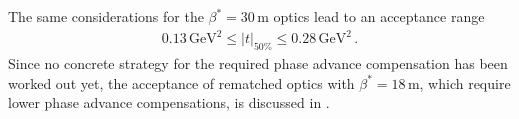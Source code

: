The same considerations for the $\beta^*=30\,$m optics lead to an acceptance range
%
\begin{align}
0.13 \, \text{GeV}^2 \leq |t|_{\text{50}\%} \leq 0.28 \, \text{GeV}^2 \, .
\end{align}
%
Since no concrete strategy for the required phase advance compensation has been worked out yet, the acceptance of rematched optics with $\beta^*=18\,$m, which require lower phase advance compensations, is discussed in .

